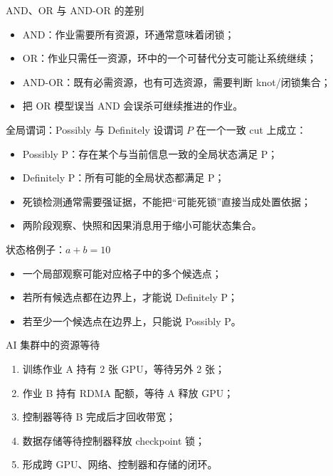 \documentclass[UTF8,fontset=none,aspectratio=169,10pt]{beamer}
\begin{document}
\begin{frame}{AND、OR 与 AND-OR 的差别}
\begin{itemize}
  \item AND：作业需要所有资源，环通常意味着闭锁；
  \item OR：作业只需任一资源，环中的一个可替代分支可能让系统继续；
  \item AND-OR：既有必需资源，也有可选资源，需要判断 knot/闭锁集合；
  \item 把 OR 模型误当 AND 会误杀可继续推进的作业。
\end{itemize}
\end{frame}

\begin{frame}{全局谓词：Possibly 与 Definitely}
设谓词 $P$ 在一个一致 cut 上成立：
\begin{itemize}
  \item Possibly P：存在某个与当前信息一致的全局状态满足 P；
  \item Definitely P：所有可能的全局状态都满足 P；
  \item 死锁检测通常需要强证据，不能把“可能死锁”直接当成处置依据；
  \item 两阶段观察、快照和因果消息用于缩小可能状态集合。
\end{itemize}
\end{frame}

\begin{frame}{状态格例子：$a+b=10$}
\begin{center}
\end{center}
\vspace{-5mm}
\begin{itemize}
  \item 一个局部观察可能对应格子中的多个候选点；
  \item 若所有候选点都在边界上，才能说 Definitely P；
  \item 若至少一个候选点在边界上，只能说 Possibly P。
\end{itemize}
\end{frame}

\begin{frame}{AI 集群中的资源等待}
\begin{enumerate}
  \item 训练作业 A 持有 2 张 GPU，等待另外 2 张；
  \item 作业 B 持有 RDMA 配额，等待 A 释放 GPU；
  \item 控制器等待 B 完成后才回收带宽；
  \item 数据存储等待控制器释放 checkpoint 锁；
  \item 形成跨 GPU、网络、控制器和存储的闭环。
\end{enumerate}
\end{frame}
\end{document}
